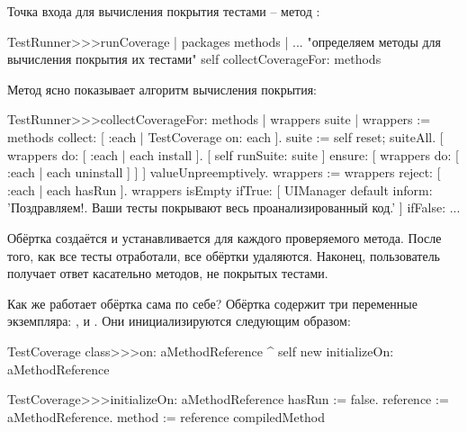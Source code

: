 \documentclass[a4paper,10pt,twoside]{book}
\begin{document}
Точка входа для вычисления покрытия тестами -- метод :
\begin{code}{}
TestRunner>>>runCoverage
	| packages methods |
	... "определяем методы для вычисления покрытия их тестами"
	self collectCoverageFor: methods
\end{code}

Метод  ясно показывает алгоритм вычисления покрытия:
\begin{code}{}
TestRunner>>>collectCoverageFor: methods
	| wrappers suite |
	wrappers := methods collect: [ :each | TestCoverage on: each ].
	suite := self
		reset;
		suiteAll.
	[ wrappers do: [ :each | each install ].
	  [ self runSuite: suite ] ensure: [ wrappers do: [ :each | each uninstall ] ] ] valueUnpreemptively.
	wrappers := wrappers reject: [ :each | each hasRun ].
	wrappers isEmpty 
		ifTrue: 
			[ UIManager default inform: 'Поздравляем!. Ваши тесты покрывают весь проанализированный код.' ]
		ifFalse: ...
\end{code}
Обёртка создаётся и устанавливается для каждого проверяемого метода.
После того, как все тесты отработали, все обёртки удаляются.
Наконец, пользователь получает ответ касательно методов, не покрытых тестами.

Как же работает обёртка сама по себе?
Обёртка  содержит три переменные экземпляра: ,  и .
Они инициализируются следующим образом:
\begin{code}{}
TestCoverage class>>>on: aMethodReference
	^ self new initializeOn: aMethodReference

TestCoverage>>>initializeOn: aMethodReference
	hasRun := false.
	reference := aMethodReference.
	method := reference compiledMethod
\end{code}
\end{document}
